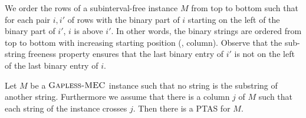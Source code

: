 We order the rows of a subinterval-free instance $M$ from top to bottom such that for each pair $i,i'$ of rows with the binary part of $i$ starting on the left of the binary part of $i'$, $i$ is above $i'$.
In other words, the binary strings are ordered from top to bottom with increasing starting position (\ie, column).
Observe that the sub-string freeness property ensures that the last binary entry of $i'$ is not on the left of the last binary entry of $i$.

\begin{lemma}\label{lem:second_instance_setting}
    Let $M$ be a $\textsc{Gapless-MEC}$ instance such that no string is the substring of another string.
    Furthermore we assume that there is a column $j$ of $M$ such that each string of the instance crosses $j$.
    Then there is a PTAS for $M$.
\end{lemma}
